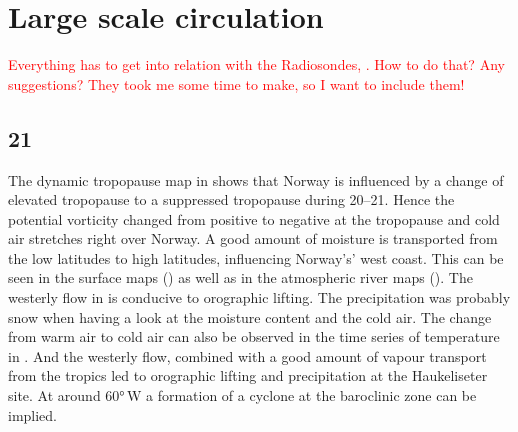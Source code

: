 \section{Large scale circulation} \label{sec:largeScale}
\textcolor{red}{Everything has to get into relation with the Radiosondes, . How to do that? Any suggestions? They took me some time to make, so I want to include them!}
\subsection*{\SI{21}{\dec}}
The dynamic tropopause map in  shows that Norway is influenced by a change of elevated tropopause to a suppressed tropopause during \SIrange{20}{21}{\dec}. Hence the potential vorticity changed from positive to negative at the tropopause and cold air stretches right over Norway.
A good amount of moisture is transported from the low latitudes to high latitudes, influencing Norway’s' west coast. This can be seen in the surface maps () as well as in the atmospheric river maps (). The westerly flow in  is conducive to orographic lifting. The precipitation was probably snow when having a look at the moisture content and the cold air. The change from warm air to cold air can also be observed in the time series of temperature in . And the westerly flow, combined with a good amount of vapour transport from the tropics led to orographic lifting and precipitation at the Haukeliseter site. 
At around \ang{60}{\,W} a formation of a cyclone at the baroclinic zone can be implied.  

